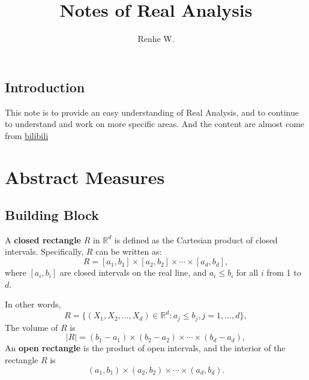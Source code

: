 \documentclass[UTF8,12pt,AutoFakeBold]{ctexbook}
\title{Notes of Real Analysis}
\author{Renhe W.}
\date{}
\numberwithin{equation}{section}
\begin{document}
	\maketitle
	\tableofcontents
	
	\newpage
	\kaishu
	\section{Introduction}
	This note is to provide an easy understanding of Real Analysis, and to continue to understand and work on more specific areas. And the content are almost come from \href{https://www.bilibili.com/video/BV1FT411C7wM/?spm_id_from=333.337.search-card.all.click&vd_source=ba9c3e9308deddcceb8190c43ed27dfd}{bilibili}
	
	
	\chapter{Abstract Measures}
	\section{Building Block}
	\begin{definition}
		A \textbf{closed rectangle} $R$ in $\mathbb{R}^d$ is defined as the Cartesian product of closed intervals. Specifically, $R$ can be written as:
		$$
		R=\left[a_1, b_1\right] \times\left[a_2, b_2\right] \times \cdots \times\left[a_d, b_d\right],
		$$
		where $\left[a_i, b_i\right]$ are closed intervals on the real line, and $a_i \leq b_i$ for all $i$ from 1 to $d$.
		
		In other words,
		$$
		R = \{(X_1,X_2,\dots,X_d)\in\mathbb{R}^d:a_j\leq b_j, j = 1,\dots,d\},
		$$
		The {\color{blue}volume} of $R$ is
		$$
			\left | R \right | = \left(b_1-a_1\right) \times \left(b_2-a_2\right) \times \cdots \times\left(b_d-a_d\right),
		$$
		An \textbf{open rectangle} is the product of open intervals, and the interior of the rectangle $R$ is
		$$
			\left(a_1, b_1\right) \times\left(a_2, b_2\right) \times \cdots \times\left(a_d, b_d\right).
		$$
	\end{definition}
	
\end{document}
